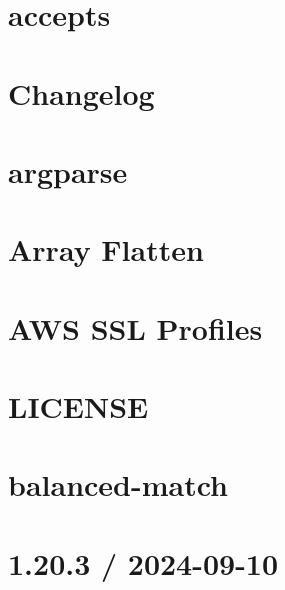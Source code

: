 \documentclass[twoside]{book}
\newcommand{\+}{\discretionary{\mbox{\scriptsize$\hookleftarrow$}}{}{}}
\begin{document}
\chapter{accepts}
\label{md_Backend_nodejs_node_modules_accepts_README}

\chapter{Changelog}
\label{md_Backend_nodejs_node_modules_argparse_CHANGELOG}

\chapter{argparse}
\label{md_Backend_nodejs_node_modules_argparse_README}

\chapter{Array Flatten}
\label{md_Backend_nodejs_node_modules_array_flatten_README}

\chapter{AWS SSL Profiles}
\label{md_Backend_nodejs_node_modules_aws_ssl_profiles_README}

\chapter{LICENSE}
\label{md_Backend_nodejs_node_modules_balanced_match_LICENSE}

\chapter{balanced-\/match}
\label{md_Backend_nodejs_node_modules_balanced_match_README}

\chapter{1.20.3 / 2024-\/09-\/10}
\label{md_Backend_nodejs_node_modules_body_parser_HISTORY}

\end{document}
